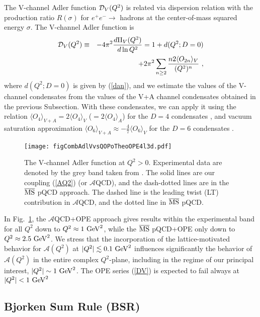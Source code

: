 \documentclass[3p,times,twocolumn]{elsarticle}
\def\bea{\begin{eqnarray}}
\def\eea{\end{eqnarray}}
\newcommand{\A}{{\mathcal{A}}}
\begin{document}
The V-channel Adler function ${\cal D}_V(Q^2)$ is related via dispersion relation with the production ratio $R(\sigma)$ for $e^+ e^- \to$ hadrons at the center-of-mass squared energy $\sigma$. The V-channel Adler function is
\bea
{\cal D}_V(Q^2) &\equiv&  - 4 \pi^2 \frac{d \Pi_V(Q^2)}{d \ln Q^2} 
 =  1 + d(Q^2;D=0) 
\nonumber\\
&&\qquad + 2 \pi^2 \sum_{n \geq 2}
 \frac{ n 2 \langle O_{2n} \rangle_V}{(Q^2)^n}  \ ,
\label{DV}
\eea
where $d(Q^2;D=0) $ is given by (\ref{dan}), and we estimate the values of the V-channel condensates from the values of the V+A channel condensates obtained in the previous Subsection. With these condensates, we can apply it using the relation $\langle O_4 \rangle_{V+A}=2 \langle O_4 \rangle_V$ ($=2 \langle O_4 \rangle_A$) for the $D=4$ condensates \cite{Braaten,PichPra}, and vacuum saturation approximation $\langle O_6 \rangle_{V+A}\approx-\frac{4}{7}\langle O_6 \rangle_V$ for the $D=6$ condensates \cite{3danQCD1,3danQCD2,Ioffe}.

\begin{figure}[htb]
\vspace{9pt}
\centering\texttt{[image: figCombAdlVvsQOPoTheoOPE4l3d.pdf]}
\caption{The V-channel Adler function at $Q^2>0$. Experimental data are denoted by the grey band taken from \cite{NestBook}. The solid lines are our coupling (\ref{AQ2}) (or $\A$QCD), and the dash-dotted lines are in the $\overline{\rm MS}$ pQCD approach. The dashed line is the leading twist (LT) contribution in $\A$QCD, and the dotted line in $\overline{\rm MS}$ pQCD.}
\label{FigDVOPE}
\end{figure}
%

In Fig.~\ref{FigDVOPE}, the $\A$QCD+OPE approach gives results within the experimental band for all $Q^2$ down to  $Q^2 \approx 1 \ {\rm GeV}^2$, while the $\overline{\rm MS}$ pQCD+OPE only down to $Q^2 \approx 2.5 \ {\rm GeV}^2$. We stress that the incorporation of the lattice-motivated behavior for $\A(Q^2)$ at $|Q^2| \lesssim 0.1 \ {\rm GeV}^2$ influences significantly the behavior of $\A(Q^2)$ in the entire complex $Q^2$-plane, including in the regime of our principal interest, $|Q^2| \sim 1 \ {\rm GeV}^2$. The OPE series (\ref{DV}) is expected to fail always at $|Q^2| < 1 \ {\rm GeV}^2$

\subsection{Bjorken Sum Rule (BSR)} 
\end{document}
